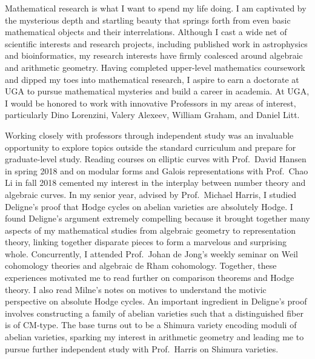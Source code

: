 \documentclass[11pt]{article}
\begin{document}
Mathematical research is what I want to spend my life doing. I am captivated by the mysterious depth and startling beauty that springs forth from even basic mathematical objects and their interrelations. Although I cast a wide net of scientific interests and research projects, including published work in astrophysics and bioinformatics, my research interests have firmly coalesced around algebraic and arithmetic geometry. Having completed upper-level mathematics coursework and dipped my toes into mathematical research, I aspire to earn a doctorate at UGA to pursue mathematical mysteries and build a career in academia. At UGA, I would be honored to work with innovative Professors in my areas of interest, particularly Dino Lorenzini, Valery Alexeev, William Graham, and Daniel Litt. 
\par
Working closely with professors through independent study was an invaluable opportunity to explore topics outside the standard curriculum and prepare for graduate-level study. 
Reading courses on elliptic curves with Prof.\ David Hansen in spring 2018 and on modular forms and Galois representations with Prof.\ Chao Li in fall 2018 cemented my interest in the interplay between number theory and algebraic curves. In my senior year, advised by Prof.\ Michael Harris, I studied Deligne's proof that Hodge cycles on abelian varieties are absolutely Hodge. I found Deligne's argument extremely compelling because it brought together many aspects of my mathematical studies from algebraic geometry to representation theory, linking together disparate pieces to form a marvelous and surprising whole. Concurrently, I attended Prof.\ Johan de Jong's weekly seminar on Weil cohomology theories and algebraic de Rham cohomology. Together, these experiences motivated me to read further on comparison theorems and Hodge theory. I also read Milne's notes on motives to understand the motivic perspective on absolute Hodge cycles. An important ingredient in Deligne's proof involves constructing a family of abelian varieties such that a distinguished fiber is of CM-type. The base turns out to be a Shimura variety encoding moduli of abelian varieties, sparking my interest in arithmetic geometry and leading me to pursue further independent study with Prof.\ Harris on Shimura varieties.
\par
\end{document}
